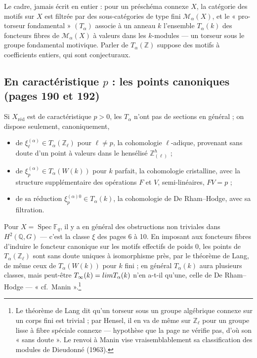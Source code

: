 \documentclass[11pt,a4paper]{article}
\begin{document}
Le cadre, jamais écrit en entier : pour un préschéma connexe $X$, la catégorie des
motifs sur $X$ est filtrée par des sous-catégories de type fini
$\mathcal{M}_{\alpha}(X)$, et le « pro-torseur fondamental » $(T_{\alpha})$
associe à un anneau $k$ l'ensemble $T_{\alpha}(k)$ des foncteurs fibres de
$\mathcal{M}_{\alpha}(X)$ à valeurs dans les $k$-modules --- un torseur sous le
groupe fondamental motivique. Parler de $T_{\alpha}(\mathbb{Z})$ suppose des
motifs à coefficients entiers, qui sont conjecturaux.

\subsection*{En caractéristique $p$ : les points canoniques (pages 190 et 192)}

Si $X_{\mathrm{réd}}$ est de caractéristique $p > 0$, les $T_{\alpha}$ n'ont pas
de sections en général ; on dispose seulement, canoniquement,
\begin{itemize}
  \item[(i)] de $\xi_{\ell}^{(\alpha)} \in T_{\alpha}(\mathbb{Z}_{\ell})$ pour $\ell
  \neq p$, la cohomologie $\ell$-adique, provenant sans doute d'un point à valeurs
  dans le hensélisé $\mathbb{Z}_{(\ell)}^{h}$ ;
  \item[(ii)] de $\xi_{p}^{(\alpha)} \in T_{\alpha}(W(k))$ pour $k$ parfait, la
  cohomologie cristalline, avec la structure supplémentaire des opérations $F$ et
  $V$, semi-linéaires, $FV = p$ ;
  \item[(iii)] de sa réduction $\xi_{p}^{(\alpha)0} \in T_{\alpha}(k)$, la
  cohomologie de De Rham--Hodge, avec sa filtration.
\end{itemize}
Pour $X = \operatorname{Spec} \mathbb{F}_{q}$, il y a en général des obstructions
non triviales dans $H^{2}(\mathbb{Q}, G)$ --- c'est la classe $\xi$ des pages 6 à
10. En imposant aux foncteurs fibres d'induire le foncteur canonique sur les
motifs effectifs de poids $0$, les points de $T_{\alpha}(\mathbb{Z}_{\ell})$
sont sans doute uniques à isomorphisme près, par le théorème de Lang, de même
ceux de $T_{\alpha}(W(k))$ pour $k$ fini ; en général $T_{\alpha}(k)$ aura
plusieurs classes, mais peut-être $T_{\infty}(k) = \varprojlim T_{\alpha}(k)$
n'en a-t-il qu'une, celle de De Rham--Hodge --- « cf.\ Manin ».\footnote{Le
théorème de Lang dit qu'un torseur sous un groupe algébrique connexe sur un corps
fini est trivial ; par Hensel, il en va de même sur $\mathbb{Z}_{\ell}$ pour un
groupe lisse à fibre spéciale connexe --- hypothèse que la page ne vérifie pas,
d'où son « sans doute ». Le renvoi à Manin vise vraisemblablement sa
classification des modules de Dieudonné (1963).}
\end{document}
